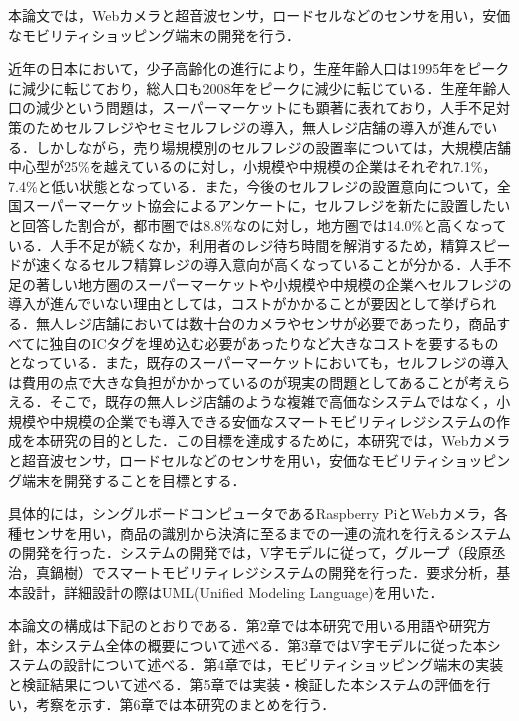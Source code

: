 


本論文では，Webカメラと超音波センサ，ロードセルなどのセンサを用い，安価なモビリティショッピング端末の開発を行う．

近年の日本において，少子高齢化の進行により，生産年齢人口は1995年をピークに減少に転じており，総人口も2008年をピークに減少に転じている\cite{population}．生産年齢人口の減少という問題は，スーパーマーケットにも顕著に表れており，人手不足対策のためセルフレジやセミセルフレジの導入，無人レジ店舗の導入が進んでいる．しかしながら，売り場規模別のセルフレジの設置率については，大規模店舗中心型が25\%を越えているのに対し，小規模や中規模の企業はそれぞれ7.1\%，7.4\%\cite{super}と低い状態となっている．また，今後のセルフレジの設置意向について，全国スーパーマーケット協会によるアンケートに，セルフレジを新たに設置したいと回答した割合が，都市圏では8.8\%なのに対し，地方圏では14.0\%\cite{super}と高くなっている．人手不足が続くなか，利用者のレジ待ち時間を解消するため，精算スピードが速くなるセルフ精算レジの導入意向が高くなっていることが分かる\cite{super}．人手不足の著しい地方圏のスーパーマーケットや小規模や中規模の企業へセルフレジの導入が進んでいない理由としては，コストがかかることが要因として挙げられる．無人レジ店舗においては数十台のカメラやセンサが必要であったり，商品すべてに独自のICタグを埋め込む必要があったりなど大きなコストを要するものとなっている．また，既存のスーパーマーケットにおいても，セルフレジの導入は費用の点で大きな負担がかかっているのが現実の問題としてあることが考えらえる．そこで，既存の無人レジ店舗のような複雑で高価なシステムではなく，小規模や中規模の企業でも導入できる安価なスマートモビリティレジシステムの作成を本研究の目的とした．この目標を達成するために，本研究では，Webカメラと超音波センサ，ロードセルなどのセンサを用い，安価なモビリティショッピング端末を開発することを目標とする．

具体的には，シングルボードコンピュータであるRaspberry PiとWebカメラ，各種センサを用い，商品の識別から決済に至るまでの一連の流れを行えるシステムの開発を行った．システムの開発では，V字モデルに従って，グループ（段原丞治，真鍋樹）でスマートモビリティレジシステムの開発を行った．要求分析，基本設計，詳細設計の際はUML(Unified Modeling Language)を用いた．

本論文の構成は下記のとおりである．第2章では本研究で用いる用語や研究方針，本システム全体の概要について述べる．第3章ではV字モデルに従った本システムの設計について述べる．第4章では，モビリティショッピング端末の実装と検証結果について述べる．第5章では実装・検証した本システムの評価を行い，考察を示す．第6章では本研究のまとめを行う．